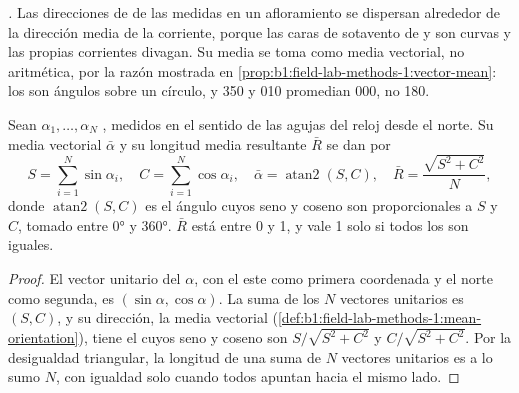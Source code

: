 \emph{.} Las direcciones de  de las  medidas en un afloramiento se dispersan alrededor de la dirección media de la corriente,
porque las caras de sotavento de  y  son curvas y las propias corrientes divagan. Su media se toma como media vectorial, no aritmética, por la razón mostrada en
\cref{prop:b1:field-lab-methods-1:vector-mean}: los  son ángulos sobre un círculo, y 350 y 010 promedian 000, no 180.

\begin{proposition}\label{prop:b1:clastic-sediments:azimuths}
Sean $\alpha_1, \ldots, \alpha_N$ , medidos en el sentido de las agujas del reloj desde el norte. Su media vectorial $\bar\alpha$ y su longitud media resultante $\bar R$ se
dan por
\[
  S = \sum_{i=1}^N \sin\alpha_i, \quad C = \sum_{i=1}^N \cos\alpha_i, \quad
  \bar\alpha = \operatorname{atan2}(S, C), \quad \bar R = \frac{\sqrt{S^2 + C^2}}{N},
\]
donde $\operatorname{atan2}(S, C)$ es el ángulo cuyos seno y coseno son proporcionales a $S$ y $C$, tomado entre \ang{0} y \ang{360}. $\bar R$ está entre 0 y 1, y vale 1 solo si
todos los  son iguales.
\end{proposition}

\begin{proof}
El vector unitario del  $\alpha$, con el este como primera coordenada y el norte como segunda, es $(\sin\alpha, \cos\alpha)$. La suma de los $N$ vectores unitarios es
$(S, C)$, y su dirección, la media vectorial (\cref{def:b1:field-lab-methods-1:mean-orientation}), tiene el  cuyos seno y coseno son $S/\sqrt{S^2+C^2}$ y
$C/\sqrt{S^2+C^2}$. Por la desigualdad triangular, la longitud de una suma de $N$ vectores unitarios es a lo sumo $N$, con igualdad solo cuando todos apuntan
hacia el mismo lado.
\end{proof}

